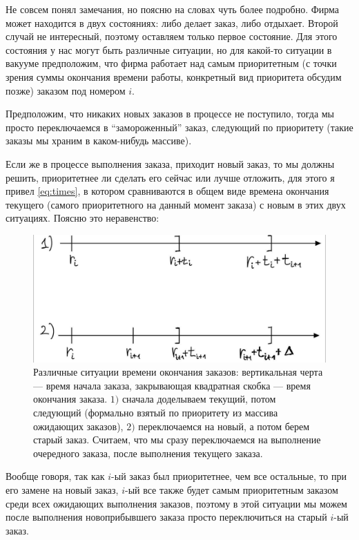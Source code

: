 \begin{upd}
    Не совсем понял замечания, но поясню на словах чуть более подробно.
    Фирма может находится в двух состояниях: либо делает заказ, либо отдыхает. Второй случай не интересный, поэтому оставляем только первое состояние. Для этого состояния у нас могут быть различные ситуации, но для какой-то ситуации в вакууме предположим, что фирма работает над самым приоритетным (с точки зрения суммы окончания времени работы, конкретный вид приоритета обсудим позже) заказом под номером $i$.
    
    Предположим, что никаких новых заказов в процессе не поступило, тогда мы просто переключаемся в ``замороженный'' заказ, следующий по приоритету (такие заказы мы храним в каком-нибудь массиве).

    Если же в процессе выполнения заказа, приходит новый заказ, то мы должны решить, приоритетнее ли сделать его сейчас или лучше отложить, для этого я привел \eqref{eq:times}, в котором сравниваются в общем виде времена окончания текущего (самого приоритетного на данный момент заказа) с новым в этих двух ситуациях. Поясню это неравенство:
    \begin{figure}[H]
        \centering
        \includegraphics[width=\textwidth]{pics/photo_2020-10-10_13-15-11.jpg}
        \caption{Различные ситуации времени окончания заказов: вертикальная черта --- время начала заказа, закрывающая квадратная скобка --- время окончания заказа. $1)$ сначала доделываем текущий, потом следующий (формально взятый по приоритету из массива ожидающих заказов), $2)$ переключаемся на новый, а потом берем старый заказ. Считаем, что мы сразу переключаемся на выполнение очередного заказа, после выполнения текущего заказа.}
    \end{figure}
    \begin{remark}
        Вообще говоря, так как $i$-ый заказ был приоритетнее, чем все остальные, то при его замене на новый заказ, $i$-ый все также будет самым приоритетным заказом среди всех ожидающих выполнения заказов, поэтому в этой ситуации мы можем после выполнения новоприбывшего заказа просто переключиться на старый $i$-ый заказ.

\end{remark}
\end{upd}
